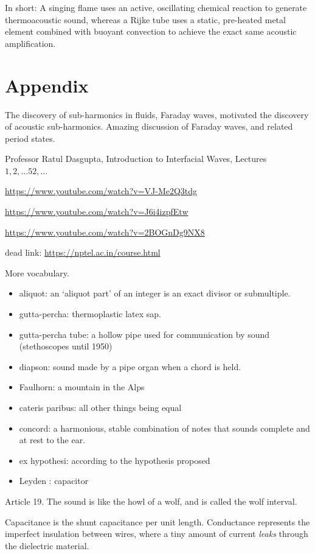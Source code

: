 In short: A singing flame uses an active, oscillating chemical reaction
to generate thermoacoustic sound, whereas a Rijke tube uses a static,
pre-heated metal element combined with buoyant convection to achieve the
exact same acoustic amplification.

\section{Appendix}\label{appendix}

The discovery of sub-harmonics in fluids, Faraday waves, motivated the
discovery of acoustic sub-harmonics. Amazing discussion of Faraday
waves, and related period states.

Professor Ratul Dasgupta, Introduction to Interfacial Waves, Lectures
\( 1,2, \dots 52, \ldots \)

\url{https://www.youtube.com/watch?v=VJ-Me2Q3tdg}

\url{https://www.youtube.com/watch?v=J6i4izpfEtw}

\url{https://www.youtube.com/watch?v=2BOGnDg9NX8}

dead link: \url{https://nptel.ac.in/course.html}

More vocabulary.

\begin{itemize}
\item
  aliquot: an `aliquot part' of an integer is an exact divisor or
  submultiple.
\item
  gutta-percha: thermoplastic latex sap.
\item
  gutta-percha tube: a hollow pipe used for communication by sound
  (stethoscopes until 1950)
\item
  diapson: sound made by a pipe organ when a chord is held.
\item
  Faulhorn: a mountain in the Alps
\item cateris paribus: all other things being equal
\item concord: a harmonious, stable combination of notes that sounds complete
and at rest to the ear.
\item ex hypothesi: according to the hypothesis proposed
\item Leyden : capacitor
\end{itemize}

Article 19. The sound is like the howl of a wolf, and is called the wolf
interval.

Capacitance is the shunt capacitance per unit length.
Conductance represents the imperfect insulation between wires, where a tiny
amount of current \textit{leaks} through the dielectric material.

